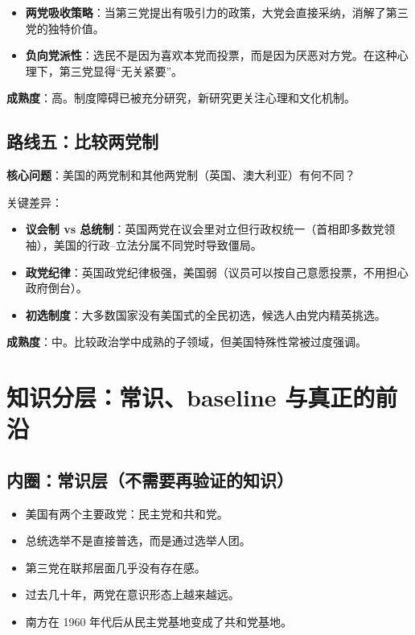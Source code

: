 \documentclass[12pt,a4paper]{ctexart}
\begin{document}
\begin{itemize}
  \item \textbf{两党吸收策略}：当第三党提出有吸引力的政策，大党会直接采纳，消解了第三党的独特价值。
  \item \textbf{负向党派性}：选民不是因为喜欢本党而投票，而是因为厌恶对方党。在这种心理下，第三党显得``无关紧要''。
\end{itemize}

\textbf{成熟度}：高。制度障碍已被充分研究，新研究更关注心理和文化机制。

\subsection{路线五：比较两党制}

\textbf{核心问题}：美国的两党制和其他两党制（英国、澳大利亚）有何不同？

关键差异：

\begin{itemize}
  \item \textbf{议会制 vs 总统制}：英国两党在议会里对立但行政权统一（首相即多数党领袖），美国的行政--立法分属不同党时导致僵局。
  \item \textbf{政党纪律}：英国政党纪律极强，美国弱（议员可以按自己意愿投票，不用担心政府倒台）。
  \item \textbf{初选制度}：大多数国家没有美国式的全民初选，候选人由党内精英挑选。
\end{itemize}

\textbf{成熟度}：中。比较政治学中成熟的子领域，但美国特殊性常被过度强调。

\section{知识分层：常识、baseline 与真正的前沿}

\subsection{内圈：常识层（不需要再验证的知识）}

\begin{itemize}
  \item 美国有两个主要政党：民主党和共和党。
  \item 总统选举不是直接普选，而是通过选举人团。
  \item 第三党在联邦层面几乎没有存在感。
  \item 过去几十年，两党在意识形态上越来越远。
  \item 南方在 1960 年代后从民主党基地变成了共和党基地。
\end{itemize}
\end{document}
